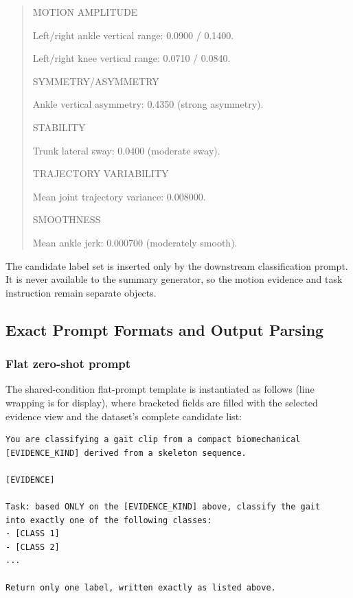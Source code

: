 \begin{quote}\small\ttfamily
MOTION AMPLITUDE\par
Left/right ankle vertical range: 0.0900 / 0.1400.\par
Left/right knee vertical range: 0.0710 / 0.0840.\par
\medskip
SYMMETRY/ASYMMETRY\par
Ankle vertical asymmetry: 0.4350 (strong asymmetry).\par
\medskip
STABILITY\par
Trunk lateral sway: 0.0400 (moderate sway).\par
\medskip
TRAJECTORY VARIABILITY\par
Mean joint trajectory variance: 0.008000.\par
\medskip
SMOOTHNESS\par
Mean ankle jerk: 0.000700 (moderately smooth).\par
\end{quote}

The candidate label set is inserted only by the downstream classification prompt. It is never available to the summary generator, so the motion evidence and task instruction remain separate objects.

\subsection{Exact Prompt Formats and Output Parsing}
\label{sec:supp_prompts}

\subsubsection{Flat zero-shot prompt}

The shared-condition flat-prompt template is instantiated as follows (line wrapping is for display), where bracketed fields are filled with the selected evidence view and the dataset's complete candidate list:

\begin{Verbatim}[fontsize=\small,frame=single]
You are classifying a gait clip from a compact biomechanical
[EVIDENCE_KIND] derived from a skeleton sequence.

[EVIDENCE]

Task: based ONLY on the [EVIDENCE_KIND] above, classify the gait
into exactly one of the following classes:
- [CLASS 1]
- [CLASS 2]
...

Return only one label, written exactly as listed above.
\end{Verbatim}


